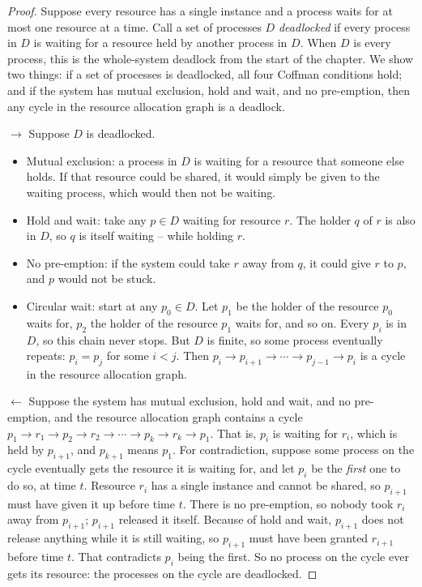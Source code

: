 \begin{proof} Suppose every resource has a single instance and a process waits for at most one resource at a time.
	Call a set of processes $D$ \emph{deadlocked} if every process in $D$ is waiting for a resource held by another process in $D$.
	When $D$ is every process, this is the whole-system deadlock from the start of the chapter.
	We show two things: if a set of processes is deadlocked, all four Coffman conditions hold; and if the system has mutual exclusion, hold and wait, and no pre-emption, then any cycle in the resource allocation graph is a deadlock.

	$\rightarrow$ Suppose $D$ is deadlocked.

	\begin{itemize}
		\item Mutual exclusion: a process in $D$ is waiting for a resource that someone else holds. If that resource could be shared, it would simply be given to the waiting process, which would then not be waiting.
		\item Hold and wait: take any $p \in D$ waiting for resource $r$. The holder $q$ of $r$ is also in $D$, so $q$ is itself waiting -- while holding $r$.
		\item No pre-emption: if the system could take $r$ away from $q$, it could give $r$ to $p$, and $p$ would not be stuck.
		\item Circular wait: start at any $p_0 \in D$. Let $p_1$ be the holder of the resource $p_0$ waits for, $p_2$ the holder of the resource $p_1$ waits for, and so on. Every $p_i$ is in $D$, so this chain never stops. But $D$ is finite, so some process eventually repeats: $p_i = p_j$ for some $i < j$. Then $p_i \rightarrow p_{i+1} \rightarrow \cdots \rightarrow p_{j-1} \rightarrow p_i$ is a cycle in the resource allocation graph.
	\end{itemize}

	$\leftarrow$ Suppose the system has mutual exclusion, hold and wait, and no pre-emption, and the resource allocation graph contains a cycle $p_1 \rightarrow r_1 \rightarrow p_2 \rightarrow r_2 \rightarrow \cdots \rightarrow p_k \rightarrow r_k \rightarrow p_1$.
	That is, $p_i$ is waiting for $r_i$, which is held by $p_{i+1}$, and $p_{k+1}$ means $p_1$.
	For contradiction, suppose some process on the cycle eventually gets the resource it is waiting for, and let $p_i$ be the \emph{first} one to do so, at time $t$.
	Resource $r_i$ has a single instance and cannot be shared, so $p_{i+1}$ must have given it up before time $t$.
	There is no pre-emption, so nobody took $r_i$ away from $p_{i+1}$; $p_{i+1}$ released it itself.
	Because of hold and wait, $p_{i+1}$ does not release anything while it is still waiting, so $p_{i+1}$ must have been granted $r_{i+1}$ before time $t$.
	That contradicts $p_i$ being the first.
	So no process on the cycle ever gets its resource: the processes on the cycle are deadlocked.
\end{proof}

